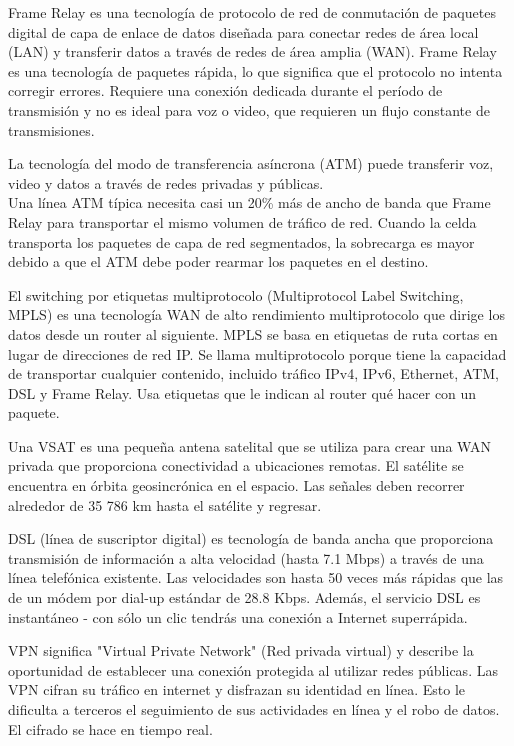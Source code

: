 \documentclass[
	12pt, %
	fleqn, %
	a4paper, %
	oneside, %
]{LegrandOrangeBook}
\begin{document}
\begin{vocabulary}
Frame Relay es una tecnología de protocolo de red de conmutación de paquetes digital de capa de enlace de datos diseñada para conectar redes de área local (LAN) y transferir datos a través de redes de área amplia (WAN). Frame Relay es una tecnología de paquetes rápida, lo que significa que el protocolo no intenta corregir errores. Requiere una conexión dedicada durante el período de transmisión y no es ideal para voz o video, que requieren un flujo constante de transmisiones.
\end{vocabulary}
\begin{vocabulary}[ATM]
La tecnología del modo de transferencia  asíncrona (ATM) puede transferir voz, video y  datos a través de redes privadas y públicas.\\
Una línea ATM típica necesita casi un 20\% más  de ancho de banda que Frame Relay para  transportar el mismo volumen de tráfico de red.
Cuando la celda transporta los paquetes de  capa de red segmentados, la sobrecarga es  mayor debido a que el ATM debe poder rearmar  los paquetes en el destino.
\end{vocabulary}
\begin{vocabulary}[MPLS]
El switching por etiquetas multiprotocolo  (Multiprotocol Label Switching, MPLS) es una  tecnología WAN de alto rendimiento multiprotocolo  que dirige los datos desde un router al siguiente. 
MPLS se basa en etiquetas de ruta cortas en lugar de direcciones de red IP. Se llama multiprotocolo porque tiene la capacidad de  transportar cualquier contenido, incluido tráfico IPv4,  IPv6, Ethernet, ATM, DSL y Frame Relay. Usa etiquetas que le indican al router qué hacer con un paquete.
\end{vocabulary}
\begin{vocabulary}[VSAT]
Una VSAT es una pequeña antena satelital que se  utiliza para crear una WAN privada que proporciona  conectividad a ubicaciones remotas. El satélite se encuentra en órbita geosincrónica en el espacio. Las señales deben recorrer alrededor de  35 786 km hasta el satélite y regresar.
\end{vocabulary}
\begin{vocabulary}[DSL]
DSL (línea de suscriptor digital) es tecnología de banda ancha que proporciona transmisión de información a alta velocidad (hasta 7.1 Mbps) a través de una línea telefónica existente. Las velocidades son hasta 50 veces más rápidas que las de un módem por dial-up estándar de 28.8 Kbps. Además, el servicio DSL es instantáneo - con sólo un clic tendrás una conexión a Internet superrápida.
\end{vocabulary}
\begin{vocabulary}[VPN]
VPN significa "Virtual Private Network" (Red privada virtual) y describe la oportunidad de establecer una conexión protegida al utilizar redes públicas. Las VPN cifran su tráfico en internet y disfrazan su identidad en línea. Esto le dificulta a terceros el seguimiento de sus actividades en línea y el robo de datos. El cifrado se hace en tiempo real.
\end{vocabulary}
\end{document}
